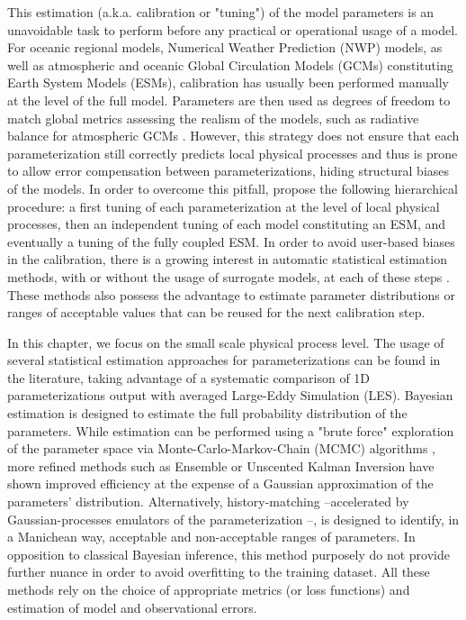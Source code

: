 \documentclass[draft]{agujournal2019}
\begin{document}
\par This estimation (a.k.a. calibration or "tuning") of the model parameters is an unavoidable task to perform before any practical or operational usage of a model. For oceanic regional models, Numerical Weather Prediction (NWP) models, as well as atmospheric and oceanic Global Circulation Models (GCMs) constituting Earth System Models (ESMs), calibration has usually been performed manually at the level of the full model. Parameters are then used as degrees of freedom to match global metrics assessing the realism of the models, such as radiative balance for atmospheric GCMs \cite{hourdin_art_2017}. However, this strategy does not ensure that each parameterization still correctly predicts local physical processes and thus is prone to allow error compensation between parameterizations, hiding structural biases of the models. In order to overcome this pitfall,  propose the following hierarchical procedure: a first tuning of each parameterization at the level of local physical processes, then an independent tuning of each model constituting an ESM, and eventually a tuning of the fully coupled ESM. In order to avoid user-based biases in the calibration, there is a growing interest in automatic statistical estimation methods, with or without the usage of surrogate models, at each of these steps \cite{hourdin_art_2017,schneider_earth_2017}. These methods also possess the advantage to estimate parameter distributions or ranges of acceptable values that can be reused for the next calibration step. 
%
\par In this chapter, we focus on the small scale physical process level. The usage of several statistical estimation approaches for parameterizations can be found in the literature, taking advantage of a systematic comparison of 1D parameterizations output with averaged Large-Eddy Simulation (LES). Bayesian estimation is designed to estimate the full probability distribution of the parameters. While estimation can be performed using a "brute force" exploration of the parameter space via Monte-Carlo-Markov-Chain (MCMC) algorithms \cite{souza_uncertainty_2020}, more refined methods such as Ensemble or Unscented Kalman Inversion \cite{dunbar_calibration_2021,wagner_formulation_,lopez-gomez_training_2022} have shown improved efficiency at the expense of a Gaussian approximation of the parameters' distribution. 
Alternatively, history-matching --accelerated by Gaussian-processes emulators of the parameterization \cite{couvreux_processbased_2021}--, is designed to identify, in a Manichean way, acceptable and non-acceptable ranges of parameters. In opposition to classical Bayesian inference, this method purposely do not provide further nuance in order to avoid overfitting to the training dataset. All these methods rely on the choice of appropriate metrics (or loss functions) and estimation of model and observational errors. 
\end{document}
